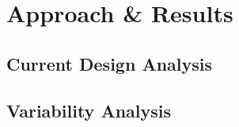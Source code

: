 \chapter{Approach \& Results}\label{chap:approach_results}

\section{Current Design Analysis}\label{sec:current_design_analysis}

\section{Variability Analysis}\label{sec:variability_analysis}

